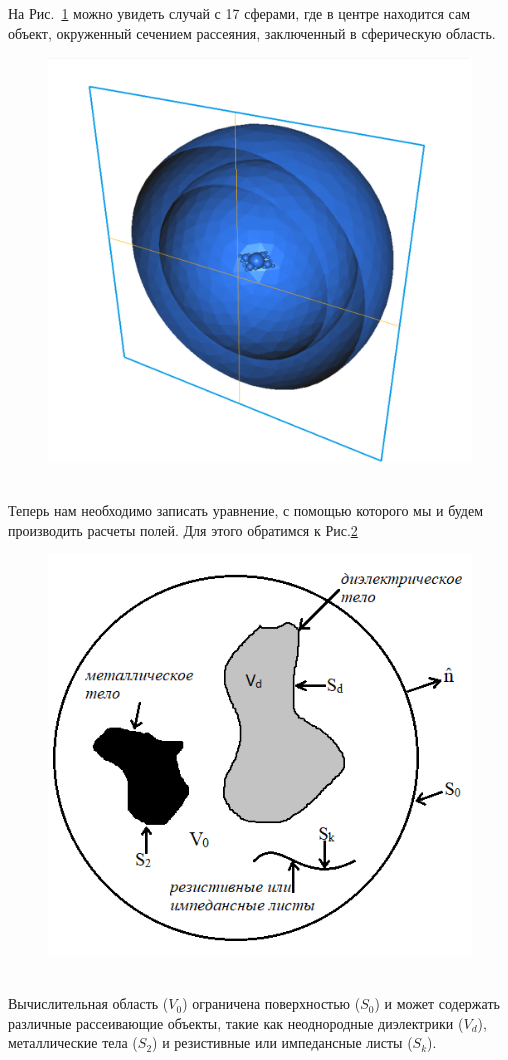 На Рис.~\ref{fig:3td_scattererAndOuterSpheres} можно увидеть случай с 17 сферами, где в центре находится сам объект, окруженный сечением рассеяния, заключенный в сферическую область.\\
\begin{figure}[h!]
	\centering
	\includegraphics[width=0.6\linewidth]{3td_scattererAndOuterSpheres}
	\caption{}
	\label{fig:3td_scattererAndOuterSpheres}
\end{figure} \\
Теперь нам необходимо записать уравнение, с помощью которого мы и будем производить расчеты полей. Для этого обратимся к Рис.\ref {fig:tes2}
\\
\begin{figure}[h]
	\centering
	\includegraphics[width=0.6\linewidth]{tes2}
	\caption{}
	\label{fig:tes2}
\end{figure}
\\
Вычислительная область ($ V_{0} $) ограничена поверхностью ($ S_{0} $) и может содержать различные рассеивающие объекты, такие как неоднородные диэлектрики ($ V_{d} $), металлические тела ($ S_{2} $) и резистивные или импедансные листы ($ S_{k} $).\\
